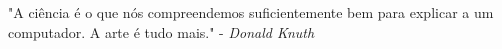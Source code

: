 \renewcommand{\epigraphname}{EPÍGRAFE}
\begin{epigrafe}
"A ciência é o que nós compreendemos suficientemente bem
para explicar a um computador. A arte é tudo mais."
- \textit{Donald Knuth}
\end{epigrafe}
